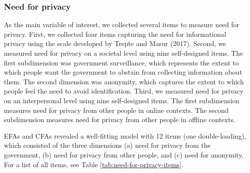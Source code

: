 \documentclass[man,floatsintext]{apa6}
\begin{document}
\hypertarget{need-for-privacy}{%
\subsubsection{Need for privacy}\label{need-for-privacy}}

As the main variable of interest, we collected several items to measure need for privacy. First, we collected four items capturing the need for informational privacy using the scale developed by Trepte and Masur (2017). Second, we measured need for privacy on a societal level using nine self-designed items. The first subdimension was government surveillance, which represents the extent to which people want the government to abstain from collecting information about them. The second dimension was anonymity, which captures the extent to which people feel the need to avoid identification. Third, we measured need for privacy on an interpersonal level using nine self-designed items. The first subdimension measures need for privacy from other people in online contexts. The second subdimension measures need for privacy from other people in offline contexts.

EFAs and CFAs revealed a well-fitting model with 12 items (one double-loading), which consisted of the three dimensions (a) need for privacy from the government, (b) need for privacy from other people, and (c) need for anonymity. For a list of all items, see Table \ref{tab:need-for-privacy-items}.
\end{document}
